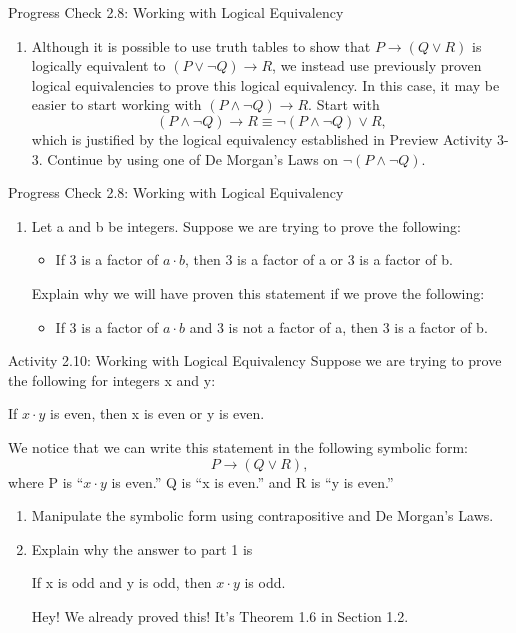 \documentclass{beamer}
\begin{document}
\begin{frame}{Progress Check 2.8: Working with Logical Equivalency}
	\begin{enumerate}
		\item Although it is possible to use truth tables to show that $P \to (Q \vee R)$ is
		logically equivalent to $(P \vee \neg Q) \to R$, we instead use previously proven
		logical equivalencies to prove this logical equivalency. In this case, it may
		be easier to start working with $(P \wedge \neg Q) \to R$.  Start with
		\[
		(P \wedge \neg Q) \to R \equiv \neg (P \wedge \neg Q) \vee R,
		\]
		which is justified by the logical equivalency established in Preview Activity 3-3. Continue by using one of De Morgan’s Laws on $\neg (P \wedge \neg Q)$.
	\end{enumerate}
	\vspace{2 in}
\end{frame}

\begin{frame}{Progress Check 2.8: Working with Logical Equivalency}
	\begin{enumerate}
		\item[2.] Let a and b be integers. Suppose we are trying to prove the following:
		\begin{itemize}
			\item If 3 is a factor of $a \cdot b$, then 3 is a factor of a or 3 is a factor of b.
		\end{itemize}
		Explain why we will have proven this statement if we prove the following:
		\begin{itemize}
			\item If 3 is a factor of $a \cdot b$ and 3 is not a factor of a, then 3 is a factor of b.
		\end{itemize}
	\end{enumerate}
	\vspace{2 in}
\end{frame}

\begin{frame}{Activity 2.10: Working with Logical Equivalency}
	Suppose we are trying to prove the
	following for integers x and y:
	\begin{center}
		If $x \cdot y$ is even, then x is even or y is even.
	\end{center}
	We notice that we can write this statement in the following symbolic form:
	\[
	P \to (Q \vee R),
	\]
	where P is ``$x \cdot y$ is even.'' Q is ``x is even.'' and R is ``y is even.''
	\begin{enumerate}
		\item Manipulate the symbolic form using contrapositive and De Morgan's Laws.\\[.5 in]\pause
		\item Explain why the answer to part 1 is
		\begin{center}
			If x is odd and y is odd, then $x \cdot y$ is odd. \pause
		\end{center}
		Hey!  We already proved this!  It's Theorem 1.6 in Section 1.2.
	\end{enumerate}
\end{frame}
\end{document}
